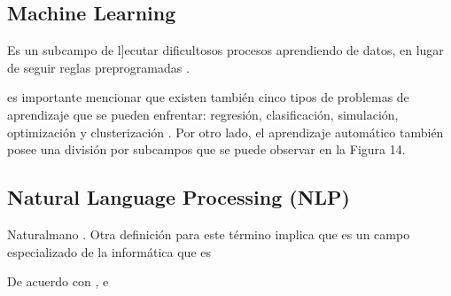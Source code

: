 \subsection{Machine Learning}
 Es un subcampo de l]ecutar dificultosos procesos aprendiendo de datos, en lugar de seguir reglas preprogramadas \parencite{tec_royal2017machine}.

 es importante mencionar que existen también cinco tipos de problemas de aprendizaje que se pueden enfrentar: regresión, clasificación, simulación, optimización y clusterización \parencite{bk_gollapudi2016practical}. Por otro lado, el aprendizaje automático también posee una división por subcampos que se puede observar en la Figura 14.
 \subsection{Natural Language Processing (NLP)}
 Naturalmano \parencite{bk_goyal2018deep}. Otra definición para este término implica que es un campo especializado de la informática que es

 De acuerdo con \citet{bk_goyal2018deep}, e
 